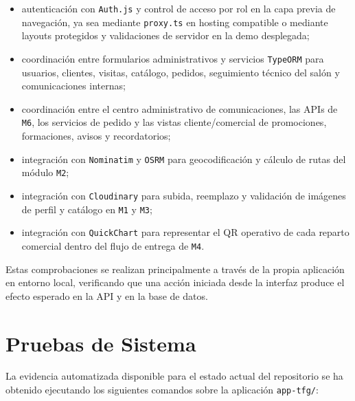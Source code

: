 \begin{itemize}
    \item autenticación con \texttt{Auth.js} y control de acceso por rol en la capa previa de navegación, ya sea mediante \texttt{proxy.ts} en hosting compatible o mediante layouts protegidos y validaciones de servidor en la demo desplegada;
    \item coordinación entre formularios administrativos y servicios \texttt{TypeORM} para usuarios, clientes, visitas, catálogo, pedidos, seguimiento técnico del salón y comunicaciones internas;
    \item coordinación entre el centro administrativo de comunicaciones, las APIs de \texttt{M6}, los servicios de pedido y las vistas cliente/comercial de promociones, formaciones, avisos y recordatorios;
    \item integración con \texttt{Nominatim} y \texttt{OSRM} para geocodificación y cálculo de rutas del módulo \texttt{M2};
    \item integración con \texttt{Cloudinary} para subida, reemplazo y validación de imágenes de perfil y catálogo en \texttt{M1} y \texttt{M3};
    \item integración con \texttt{QuickChart} para representar el QR operativo de cada reparto comercial dentro del flujo de entrega de \texttt{M4}.
\end{itemize}

Estas comprobaciones se realizan principalmente a través de la propia aplicación en entorno local, verificando que una acción iniciada desde la interfaz produce el efecto esperado en la API y en la base de datos.

\section{Pruebas de Sistema}

La evidencia automatizada disponible para el estado actual del repositorio se ha obtenido ejecutando los siguientes comandos sobre la aplicación \texttt{app-tfg/}:

